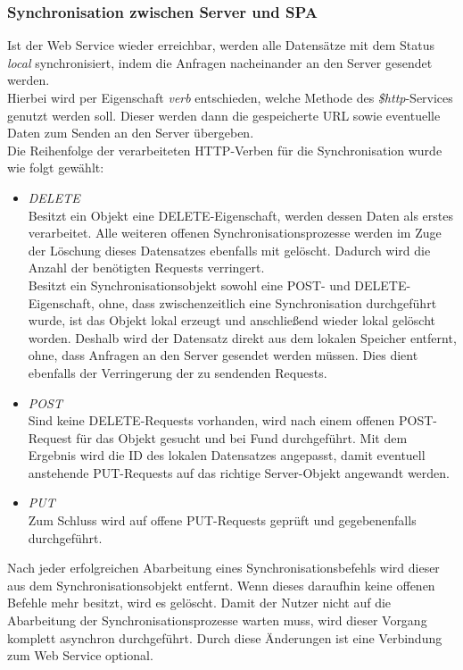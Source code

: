 \subsubsection*{Synchronisation zwischen Server und SPA}
\label{ssec:Sync-SPA}
Ist der Web Service wieder erreichbar, werden alle Datensätze mit dem Status \textit{local} synchronisiert, indem die Anfragen nacheinander an den Server gesendet werden. \\
Hierbei wird per Eigenschaft \textit{verb} entschieden, welche Methode des \textit{\$http}-Services genutzt werden soll. Dieser werden dann die gespeicherte URL sowie eventuelle Daten zum Senden an den Server übergeben. \\
Die Reihenfolge der verarbeiteten \ac{HTTP}-Verben für die Synchronisation wurde wie folgt gewählt:
\begin{itemize}
\item \textit{DELETE}\\
Besitzt ein Objekt eine DELETE-Eigenschaft, werden dessen Daten als erstes verarbeitet. Alle weiteren offenen Synchronisationsprozesse werden im Zuge der Löschung dieses Datensatzes ebenfalls mit gelöscht. Dadurch wird die Anzahl der benötigten Requests verringert. \\
Besitzt ein Synchronisationsobjekt sowohl eine POST- und DELETE-Eigenschaft, ohne, dass zwischenzeitlich eine Synchronisation durchgeführt wurde, ist das Objekt lokal erzeugt und anschließend wieder lokal gelöscht worden. Deshalb wird der Datensatz direkt aus dem lokalen Speicher entfernt, ohne, dass Anfragen an den Server gesendet werden müssen. Dies dient ebenfalls der Verringerung der zu sendenden Requests. 
\item \textit{POST} \\
Sind keine DELETE-Requests vorhanden, wird nach einem offenen POST- Request für das Objekt gesucht und bei Fund durchgeführt. Mit dem Ergebnis wird die ID des lokalen Datensatzes angepasst, damit eventuell anstehende PUT-Requests auf das richtige Server-Objekt angewandt werden.
\item \textit{PUT} \\
Zum Schluss wird auf offene PUT-Requests geprüft und gegebenenfalls durchgeführt. 
\end{itemize}
Nach jeder erfolgreichen Abarbeitung eines Synchronisationsbefehls wird dieser aus dem Synchronisationsobjekt entfernt. Wenn dieses daraufhin keine offenen Befehle mehr besitzt, wird es gelöscht. 
Damit der Nutzer nicht auf die Abarbeitung der Synchronisationsprozesse warten muss, wird dieser Vorgang komplett asynchron durchgeführt. Durch diese Änderungen ist eine Verbindung zum Web Service optional.

